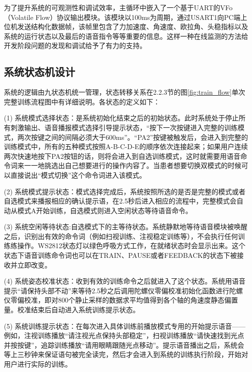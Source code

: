 为了提升系统的可观测性和调试效率，主循环中嵌入了一个基于UART的VFo（Volatile Flow）协议输出模块。该模块以100ms为周期，通过USART1向PC端上位机发送结构化数据帧，该帧里包含了力加速度、角速度、欧拉角、头稳指标以及系统的运行状态以及最后的语音指令等等重要的信息。这样一种在线监测的方法给开发阶段问题的发现和调试给予了有力的支持。

\subsection{系统状态机设计}

系统的逻辑由九状态机统一管理，状态转移关系在2.2.3节的图\ref{fig:train_flow}单次完整训练流程图中有详细说明。各状态的定义如下：  %

(1) 系统模式选择状态：是系统初始化结束之后的初始状态。此时系统处于停止所有刺激输出、语音播报模式选择引导提示状态，“按下一次按键进入完整的训练模式，两次按键之间的间隔必须大于600ms”。“PA2”按键被触发后，会进入到完整的训练模式中，所有的五种模式按照A-B-C-D-E的顺序依次连接起来；如果用户连续两次快速地按下PA2按钮的话，则将会进入到自选训练模式，这时就需要用语音命令词来一一地挑选出自己想要进行的操作内容了。当患者想要切换双模式的时候可以直接说出“模式切换”这个命令词进入该模式。

(2) 系统模式提示状态：模式选择完成后，系统按照所选的是否是完整的模式或者自选模式来播报相应的确认提示语，在2.5秒后进入相应的流程中，完整模式会自动从模式A开始训练，自选模式则进入空闲状态等待语音命令。

(3) 系统空闲等待状态:自选模式下的主等待状态。系统静默地等待语音模块被唤醒之后，识别出有效的命令词（例如扫视训练、注视稳定训练等），不会执行任何训练练操作。WS2812状态灯以绿色呼吸方式工作，在就绪状态时会显示出来。这个状态下语音训练命令词也可以在TRAIN、PAUSE或者FEEDBACK的状态下被接收并立即改变。

(4) 系统姿态校准状态：收到有效的训练命令之后就进入了这个状态。系统用语音提示“请保持头部不动”来等待2.5秒之后调用陀螺仪零偏校准初始化函数进行陀螺仪零偏校准，即对800个静止采样的数据求平均值得到各个轴的角速度静态偏置量。校准结束后自动进入系统训练提示状态。

(5) 系统训练提示状态：在每次进入具体训练前播放模式专用的开始提示语音——例如，注视训练播放“请注视光点保持头部稳定”，扫视训练播放“请快速找到光点并按按键”，追踪训练播放“请用眼睛跟随光点移动”。提示语音播出之后，系统会等上三秒钟来保证语句被完全读完，然后才会进入到系统的训练执行阶段，开始对用户进行实际的训练。

